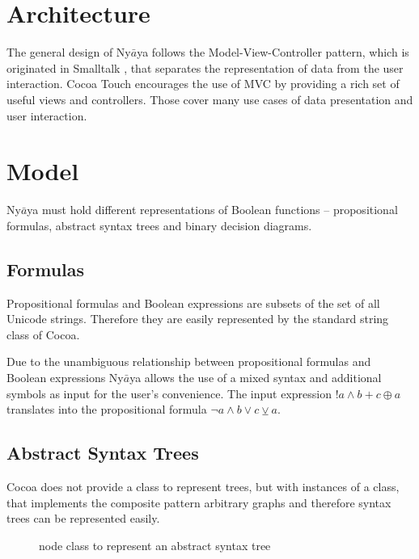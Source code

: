 
\section{Architecture}

The general design of Ny$\bar{a}$ya follows the Model-View-Controller pattern,
which is originated in Smalltalk \cite[p.4]{GAMMAETAL}, 
that separates the representation of data from the user interaction.
Cocoa Touch  encourages the use of MVC by providing a rich set of useful views and controllers.
Those cover many use cases of data presentation and user interaction.

\section{Model}

Ny$\bar{a}$ya must hold different representations of Boolean functions – propositional formulas, abstract syntax trees and binary decision diagrams. 

\subsection{Formulas}
Propositional formulas and Boolean expressions are subsets of the set of all Unicode strings. 
Therefore they are easily represented by the standard string class of Cocoa. 

Due to the unambiguous relationship between propositional formulas and Boolean expressions 
Ny$\bar{a}$ya allows the use of a mixed syntax and additional symbols as input
for the user's convenience. The input expression $!a \wedge b + c \oplus a$ translates into the propositional formula
$\neg a \wedge b \vee c \veebar a$.

\subsection{Abstract Syntax Trees}

Cocoa does not provide a class to represent trees, 
but with instances of a class, 
that implements the composite pattern \cite[p.163ff]{GAMMAETAL}
arbitrary graphs and therefore syntax trees can be represented easily.

\begin{figure}[htbp]
\begin{center}
\caption{node class to represent an abstract syntax tree}
\label{fig:NyayaNodeCluster}
\end{center}
\end{figure}

